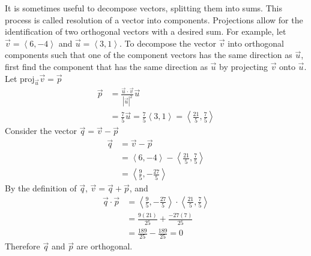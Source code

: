\documentclass[a4paper]{article}
\newcommand{\la}{\left\langle}
\newcommand{\ra}{\right\rangle}
\newcommand\proj[2]{\text{proj}_{\vec{#1}}{\vec{#2}}}
\begin{document}
It is sometimes useful to decompose vectors, splitting them into sums. This process is called resolution of a vector into components. Projections allow for the identification of two orthogonal vectors with a desired sum. For example, let $\vec{v} = \la 6, -4 \ra$ and $\vec{u} = \la 3, 1 \ra$. To decompose the vector $\vec{v}$ into orthogonal components such that one of the component vectors has the same direction as $\vec{u}$, first find the component that has the same direction as $\vec{u}$ by projecting $\vec{v}$ onto $\vec{u}$. Let $\proj{u}{v} = \vec{p}$
\begin{align*}
    \vec{p} &= \frac{\vec{u} \cdot \vec{v}}{|\vec{u}|^2}\vec{u}\\
    &= \frac{7}{5}\vec{u} = \frac{7}{5} \la 3, 1 \ra = \la \frac{21}{5}, \frac{7}{5} \ra
\end{align*}
Consider the vector $\vec{q} = \vec{v} - \vec{p}$
\begin{align*}
    \vec{q} &= \vec{v} - \vec{p}\\
    &= \la 6, -4 \ra - \la \frac{21}{5}, \frac{7}{5} \ra\\
    &= \la \frac{9}{5}, -\frac{27}{5} \ra
\end{align*}
By the definition of $\vec{q}$, $\vec{v} = \vec{q} + \vec{p}$, and
\begin{align*}
    \vec{q} \cdot \vec{p} &= \la \frac{9}{5}, -\frac{27}{5} \ra \cdot \la \frac{21}{5}, \frac{7}{5} \ra\\
    &= \frac{9(21)}{25} + \frac{-27(7)}{25}\\
    &= \frac{189}{25} - \frac{189}{25} = 0
\end{align*}
Therefore $\vec{q}$ and $\vec{p}$ are orthogonal.

\newpage
\end{document}
